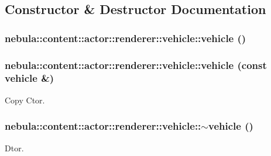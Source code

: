 \subsection{Constructor \& Destructor Documentation}
\hypertarget{classnebula_1_1content_1_1actor_1_1renderer_1_1vehicle_ab594788c7c171253d747fa8ccff048e3}{
\subsubsection[{vehicle}]{\setlength{\rightskip}{0pt plus 5cm}nebula::content::actor::renderer::vehicle::vehicle ()}}
\label{classnebula_1_1content_1_1actor_1_1renderer_1_1vehicle_ab594788c7c171253d747fa8ccff048e3}
\hypertarget{classnebula_1_1content_1_1actor_1_1renderer_1_1vehicle_a7209e183cf1631b8ae8d3a3451467e22}{
\subsubsection[{vehicle}]{\setlength{\rightskip}{0pt plus 5cm}nebula::content::actor::renderer::vehicle::vehicle (const {\bf vehicle} \&)}}
\label{classnebula_1_1content_1_1actor_1_1renderer_1_1vehicle_a7209e183cf1631b8ae8d3a3451467e22}


Copy Ctor. \hypertarget{classnebula_1_1content_1_1actor_1_1renderer_1_1vehicle_a167c746fa67918e6fd6dc85550e972e8}{
\subsubsection[{$\sim$vehicle}]{\setlength{\rightskip}{0pt plus 5cm}nebula::content::actor::renderer::vehicle::$\sim$vehicle ()}}
\label{classnebula_1_1content_1_1actor_1_1renderer_1_1vehicle_a167c746fa67918e6fd6dc85550e972e8}


Dtor. 

